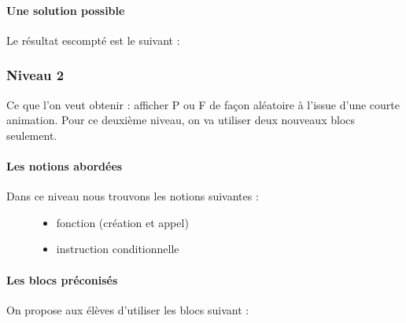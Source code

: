 \documentclass[letterpaper,10pt,french]{sphinxmanual}
\begin{document}
\paragraph{Une solution possible}
\label{\detokenize{decouverte/pileface-bloc1:une-solution-possible}}
Le résultat escompté est le suivant :



\subsubsection{Niveau 2}
\label{\detokenize{decouverte/pileface-bloc2::doc}}\label{\detokenize{decouverte/pileface-bloc2:niveau-2}}
Ce que l’on veut obtenir : afficher P ou F de façon aléatoire à l’issue d’une courte animation.
Pour ce deuxième niveau, on va utiliser deux nouveaux blocs seulement.


\paragraph{Les notions abordées}
\label{\detokenize{decouverte/pileface-bloc2:les-notions-abordees}}\begin{description}
\item[{Dans ce niveau nous trouvons les notions suivantes :}] \leavevmode\begin{itemize}
\item {} 
fonction (création et appel)

\item {} 
instruction conditionnelle

\end{itemize}

\end{description}



\paragraph{Les blocs préconisés}
\label{\detokenize{decouverte/pileface-bloc2:les-blocs-preconises}}
On propose aux élèves d’utiliser les blocs suivant :

\end{document}
